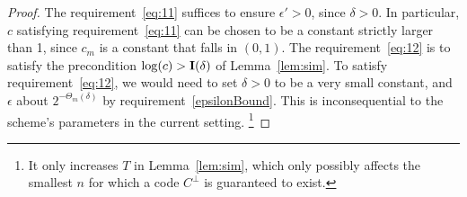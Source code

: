 \begin{proof}
The requirement~\ref{eq:11} suffices to ensure $\epsilon' >0$, since $\delta> 0$. In particular, $c$ satisfying requirement~\ref{eq:11} can be chosen to be a constant strictly larger than 1, since $c_m$ is a constant that falls in $(0,1)$.
The requirement~\ref{eq:12} is to satisfy the precondition $\log(c)>\mathbf{I}({\delta})$ of Lemma~\ref{lem:sim}.
To satisfy requirement~\ref{eq:12}, we would need to set $\delta>0$ to be a very small constant, and $\epsilon$ about $2^{-\Theta_m(\delta)}$ by requirement~\ref{epsilonBound}.
This is inconsequential to the scheme's parameters in the current setting. \footnote{It only increases $T$ in Lemma~\ref{lem:sim}, which only possibly affects the smallest $n$ for which a code $C^\bot$ is guaranteed to exist.}
\end{proof}
